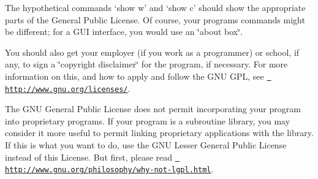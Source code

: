 The hypothetical commands `show w' and `show c' should show the appropriate parts of the General Public License. Of course, your program\textquotesingle{}s commands might be different; for a G\+UI interface, you would use an \char`\"{}about box\char`\"{}.

You should also get your employer (if you work as a programmer) or school, if any, to sign a \char`\"{}copyright disclaimer\char`\"{} for the program, if necessary. For more information on this, and how to apply and follow the G\+NU G\+PL, see \href{http://www.gnu.org/licenses/}{\texttt{ http\+://www.\+gnu.\+org/licenses/}}.

The G\+NU General Public License does not permit incorporating your program into proprietary programs. If your program is a subroutine library, you may consider it more useful to permit linking proprietary applications with the library. If this is what you want to do, use the G\+NU Lesser General Public License instead of this License. But first, please read \href{http://www.gnu.org/philosophy/why-not-lgpl.html}{\texttt{ http\+://www.\+gnu.\+org/philosophy/why-\/not-\/lgpl.\+html}}. 